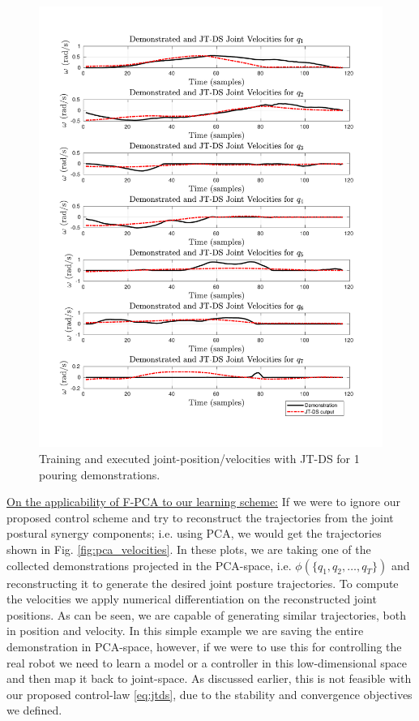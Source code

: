 \documentclass{article}
\begin{document}
\begin{enumerate}
\begin{figure}[!th]
\begin{minipage}{0.5\textwidth}
       	\includegraphics[trim={1.2cm 1.5cm 1.7cm 1.5cm},clip,width=\linewidth]{../../src/JTDS_mat_lib/figures/jtd_vel_pour1.pdf}
    \end{minipage}
   \caption{Training and executed joint-position/velocities with JT-DS for 1 pouring demonstrations. \label{fig:jtds_velocities}}
\end{figure}

\noindent \underline{On the applicability of F-PCA to our learning scheme:}  If we were to ignore our proposed control scheme and try to reconstruct the trajectories from the joint postural synergy components; i.e. using PCA, we would get the trajectories shown in Fig. \ref{fig:pca_velocities}. In these plots, we are taking one of the collected demonstrations projected in the PCA-space, i.e. $\phi(\{q_1,q_2,\dots,q_T\})$ and reconstructing it to generate the desired joint posture trajectories. To compute the velocities we apply numerical differentiation on the reconstructed joint positions. As can be seen, we are capable of generating similar trajectories, both in position and velocity. In this simple example we are saving the entire demonstration in PCA-space, however, if we were to use this for controlling the real robot we need to learn a model or a controller in this low-dimensional space and then map it back to joint-space. As discussed earlier, this is not feasible with our proposed control-law \eqref{eq:jtds}, due to the stability and convergence objectives we defined. 


\end{enumerate}
\end{document}

